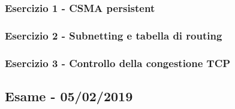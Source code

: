 \documentclass[a4paper]{article}
\begin{document}
	\subsubsection{Esercizio 1 - CSMA persistent}
	
	\subsubsection{Esercizio 2 - Subnetting e tabella di routing}
	
	\subsubsection{Esercizio 3 - Controllo della congestione TCP}

\newpage

	\subsection[\textbf{Esame - 05/02/2019}]{Esame - 05/02/2019}
	
\end{document}
